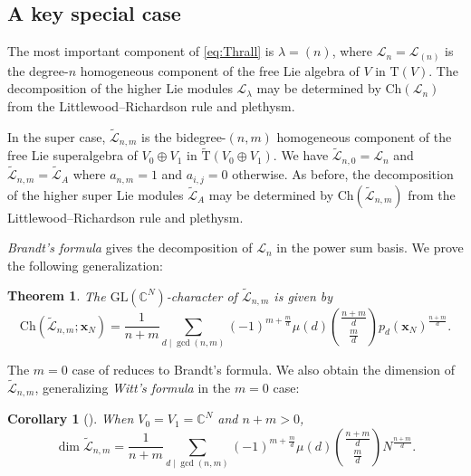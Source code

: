\documentclass[11pt]{article}
\newtheorem{thm}[theo]{Theorem}
\newtheorem{coro}[theo]{Corollary}
\theoremstyle{definition}
\numberwithin{equation}{section}
\newcommand\CC{\mathbb{C}}
\newcommand\ch{\Ch}
\newcommand\GL{\mathrm{GL}}
\newcommand\Trm{\mathrm{T}}
\newcommand\xb{\mathbf{x}}
\newcommand\Lcal{\mathcal{L}}
\newcommand\Ltil{\widetilde{\mathcal{L}}}
\newcommand\Trmtil{\widetilde{\Trm}}
\newcommand\Ch{\mathrm{Ch}}
\begin{document}
\subsection{A key special case}
The most important component of \eqref{eq:Thrall} is $\lambda = (n)$, where $\Lcal_n = \Lcal_{(n)}$ is the degree-$n$ homogeneous component of the free Lie algebra of $V$ in $\Trm(V)$. The decomposition of the higher Lie modules $\Lcal_\lambda$ may be determined by $\ch(\Lcal_n)$ from the Littlewood--Richardson rule and plethysm.

In the super case, $\widetilde{\Lcal}_{n,m}$ is the bidegree-$(n,m)$ homogeneous component of the free Lie superalgebra of $V_0 \oplus V_1$ in $\Trmtil(V_0 \oplus V_1)$. We have $\widetilde{\Lcal}_{n,0} = \Lcal_n$ and $\widetilde{\Lcal}_{n,m} = \widetilde{\Lcal}_A$ where $a_{n,m}=1$ and $a_{i,j} = 0$ otherwise. As before, the decomposition of the higher super Lie modules $\widetilde{\Lcal}_A$ may be determined by $\ch(\widetilde{\Lcal}_{n,m})$ from the Littlewood--Richardson rule and plethysm.

\textit{Brandt's formula} \cite{Brandt} gives the decomposition of $\Lcal_n$ in the power sum basis. We prove the following generalization:
\begin{thm}\label{thm:super-brandt}
    The $\GL(\CC^N)$-character of $\Ltil_{n,m}$ is given by
    \begin{equation}
        \ch(\Ltil_{n,m}; \xb_N) = \frac{1}{n+m} \sum_{d \mid \gcd(n,m)} (-1)^{m + \frac{m}{d}} \mu(d) \binom{\frac{n+m}{d}}{\frac{m}{d}} p_d(\xb_N)^\frac{n+m}{d}.
    \end{equation}
\end{thm}
The $m=0$ case of  reduces to Brandt's formula. We also obtain the dimension of $\Ltil_{n, m}$, generalizing \textit{Witt's formula} \cite{Witt} in the $m=0$ case:

\begin{coro}[{\cite{Pet}}]\label{cor:super-Witt}
    When $V_0 = V_1 = \mathbb{C}^N$ and $n+m > 0$,
      \[ \dim \Ltil_{n,m} = \frac{1}{n+m} \sum_{d \mid \gcd(n, m)} (-1)^{m + \frac{m}{d}} \mu(d) \binom{\frac{n+m}{d}}{\frac{m}{d}} N^{\frac{n+m}{d}}. \]
\end{coro}
\end{document}
